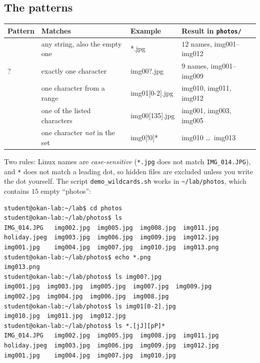 \documentclass[11pt,a4paper]{article}
\newcommand{\cmd}[1]{\texttt{#1}}
\begin{document}
\subsection{The patterns}

\begin{center}
\renewcommand{\arraystretch}{1.25}
\begin{tabularx}{\linewidth}{>{\ttfamily}l >{\raggedright\arraybackslash}X >{\ttfamily}l >{\raggedright\arraybackslash}X}
\toprule
\textrm{\textbf{Pattern}} & \textbf{Matches} & \textrm{\textbf{Example}} & \textbf{Result in \texttt{photos/}} \\
\midrule
* & any string, also the empty one & *.jpg & $12$ names, img001--img012 \\
? & exactly one character & img00?.jpg & $9$ names, img001--img009 \\
{[0-2]} & one character from a range & img01[0-2].jpg & img010, img011, img012 \\
{[135]} & one of the listed characters & img00[135].jpg & img001, img003, img005 \\
{[!0]} & one character \emph{not} in the set & img0[!0]* & img010 \dots\ img013 \\
\bottomrule
\end{tabularx}
\end{center}

Two rules: Linux names are \emph{case-sensitive} (\texttt{*.jpg} does not match \texttt{IMG\_014.JPG}), and \texttt{*} does not match a leading dot, so hidden files are excluded unless you write the dot yourself. The script \cmd{demo\_wildcards.sh} works in \texttt{\textasciitilde/lab/photos}, which contains $15$ empty ``photos'':

\begin{lstlisting}[style=term]
student@okan-lab:~/lab$ cd photos
student@okan-lab:~/lab/photos$ ls
IMG_014.JPG   img002.jpg  img005.jpg  img008.jpg  img011.jpg
holiday.jpeg  img003.jpg  img006.jpg  img009.jpg  img012.jpg
img001.jpg    img004.jpg  img007.jpg  img010.jpg  img013.png
student@okan-lab:~/lab/photos$ echo *.png
img013.png
student@okan-lab:~/lab/photos$ ls img00?.jpg
img001.jpg  img003.jpg  img005.jpg  img007.jpg  img009.jpg
img002.jpg  img004.jpg  img006.jpg  img008.jpg
student@okan-lab:~/lab/photos$ ls img01[0-2].jpg
img010.jpg  img011.jpg  img012.jpg
student@okan-lab:~/lab/photos$ ls *.[jJ][pP]*
IMG_014.JPG   img002.jpg  img005.jpg  img008.jpg  img011.jpg
holiday.jpeg  img003.jpg  img006.jpg  img009.jpg  img012.jpg
img001.jpg    img004.jpg  img007.jpg  img010.jpg
\end{lstlisting}
\end{document}
